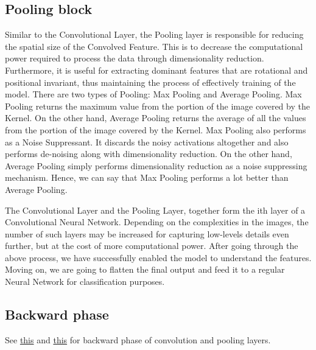 \documentclass[10pt]{SelfArx} %
\begin{document}
\subsection{Pooling block}
	Similar to the Convolutional Layer, the Pooling layer is responsible for reducing the spatial size of the Convolved Feature. This is to decrease the computational power required to process the data through dimensionality reduction. Furthermore, it is useful for extracting dominant features that are rotational and positional invariant, thus maintaining the process of effectively training of the model.
	There are two types of Pooling: Max Pooling and Average Pooling. Max Pooling returns the maximum value from the portion of the image covered by the Kernel. On the other hand, Average Pooling returns the average of all the values from the portion of the image covered by the Kernel.
	Max Pooling also performs as a Noise Suppressant. It discards the noisy activations altogether and also performs de-noising along with dimensionality reduction. On the other hand, Average Pooling simply performs dimensionality reduction as a noise suppressing mechanism. Hence, we can say that Max Pooling performs a lot better than Average Pooling.
	
	The Convolutional Layer and the Pooling Layer, together form the ith layer of a Convolutional Neural Network. Depending on the complexities in the images, the number of such layers may be increased for capturing low-levels details even further, but at the cost of more computational power.
	After going through the above process, we have successfully enabled the model to understand the features. Moving on, we are going to flatten the final output and feed it to a regular Neural Network for classification purposes.
	\subsection{Backward phase}
	See \href{https://medium.com/@2017csm1006/forward-and-backpropagation-in-convolutional-neural-network-4dfa96d7b37e}{this} and \href{https://becominghuman.ai/back-propagation-in-convolutional-neural-networks-intuition-and-code-714ef1c38199}{this} for backward phase of convolution and pooling layers.
	
\end{document}
